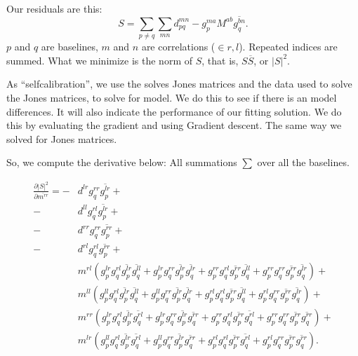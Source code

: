 \documentclass[12pt]{article}
\begin{document}
\par Our residuals are this:
\begin{equation}
S = \sum_{p\neq q} \sum_{mn} d_{pq}^{mn} - g_p^{ma} M^{ab} \overline{g_q^{bn}}.
\end{equation}
$p$ and $q$ are baselines, $m$ and $n$ are correlations ($\in {r,l}$). Repeated indices are summed. 
What we minimize is the norm of $S$, that is, $S\overline{S}$, or $|S|^2$.

\par As ``selfcalibration'', we use the solves Jones matrices and the data used to solve the Jones matrices, to solve for model. 
We do this to see if there is an model differences. 
It will also indicate the performance of our fitting solution.
We do this by evaluating the gradient and using Gradient descent. 
The same way we solved for Jones matrices.

\par So, we compute the derivative below: All summations $\sum$ over all the baselines.

\begin{equation}
\begin{split}
\frac{\partial |S|^2}{\partial \overline{m^{rr}}} = 
	- &d^{lr} g_q^{rr} \overline{g_p^{lr}}+\\
	- &d^{ll} g_q^{rl} \overline{g_p^{lr}}+\\
	- &d^{rr} g_q^{rr} \overline{g_p^{rr}}+\\
	- &d^{rl} g_q^{rl} \overline{g_p^{rr}}+\\
	&m^{rl} \left(g_p^{lr} g_q^{rl} \overline{g_p^{lr}} \overline{g_q^{ll}} + g_p^{lr} g_q^{rr} \overline{g_p^{lr}} \overline{g_q^{lr}} + g_p^{rr} g_q^{rl} \overline{g_p^{rr}} \overline{g_q^{ll}} + g_p^{rr} g_q^{rr} \overline{g_p^{rr}} \overline{g_q^{lr}}\right)+\\
	&m^{ll} \left(g_p^{ll} g_q^{rl} \overline{g_p^{lr}} \overline{g_q^{ll}} + g_p^{ll} g_q^{rr} \overline{g_p^{lr}} \overline{g_q^{lr}} + g_p^{rl} g_q^{rl} \overline{g_p^{rr}} \overline{g_q^{ll}} + g_p^{rl} g_q^{rr} \overline{g_p^{rr}} \overline{g_q^{lr}}\right)+\\
	&m^{rr} \left(g_p^{lr} g_q^{rl} \overline{g_p^{lr}} \overline{g_q^{rl}} + g_p^{lr} g_q^{rr} \overline{g_p^{lr}} \overline{g_q^{rr}} + g_p^{rr} g_q^{rl} \overline{g_p^{rr}} \overline{g_q^{rl}} + g_p^{rr} g_q^{rr} \overline{g_p^{rr}} \overline{g_q^{rr}}\right)+\\
	&m^{lr} \left(g_p^{ll} g_q^{rl} \overline{g_p^{lr}} \overline{g_q^{rl}} + g_p^{ll} g_q^{rr} \overline{g_p^{lr}} \overline{g_q^{rr}} + g_p^{rl} g_q^{rl} \overline{g_p^{rr}} \overline{g_q^{rl}} + g_p^{rl} g_q^{rr} \overline{g_p^{rr}} \overline{g_q^{rr}}\right).
\end{split}
\end{equation}
\end{document}
